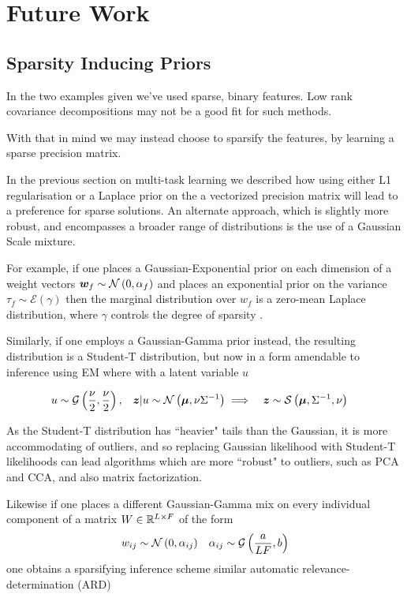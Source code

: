 

\section{Future Work}
\subsection{Sparsity Inducing Priors}
In the two examples given we've used sparse, binary features. Low rank covariance decompositions may not be a good fit for such methods.

With that in mind we may instead choose to sparsify the features, by learning a sparse precision matrix.

In the previous section on multi-task learning we described how using either L1 regularisation or a Laplace prior on the a vectorized precision matrix will lead to a preference for sparse solutions. An alternate approach, which is slightly more robust, and encompasses a broader range of distributions is the use of a Gaussian Scale mixture.

For example, if one places a Gaussian-Exponential prior on each dimension of a weight vectors $\bm w_f \sim \mathcal{N} \left( {0}, {\alpha_f} \right)$ and places an exponential prior on the variance $\tau_f \sim \mathcal{E}\left(\gamma\right)$ then the marginal distribution over $w_f$ is a zero-mean Laplace distribution, where $\gamma$ controls the degree of sparsity \cite{Figueiredo2003}.

Similarly, if one employs a Gaussian-Gamma prior instead, the resulting distribution is a Student-T distribution, but now in a form amendable to inference using EM where with a latent variable $u$

\begin{align}
u & \sim \mathcal{G}\left(\frac{\nu}{2}, \frac{\nu}{2} \right) ,
& \bm z|u \sim \mathcal{N} \left( {\bm \mu}, {\nu {\Sigma}^{-1}} \right) 
& \implies & \bm z & \sim \mathcal{S}\left(\bm \mu, {\Sigma}^{-1}, \nu \right)
\end{align}

As the Student-T distribution has ``heavier" tails than the Gaussian, it is more accommodating of outliers, and so replacing Gaussian likelihood with Student-T likelihoods can lead algorithms which are more ``robust" to outliers, such as PCA and CCA\cite{Archambeau2006a}, and also matrix factorization\cite{Balaji2011}.

Likewise if one places a different Gaussian-Gamma mix on every individual component of a matrix $W \in { \mathbb{R}^{L \times F} }$ of the form
\begin{align}
w_{ij} &\sim \mathcal{N} \left( {0}, {\alpha_{ij}} \right) & \alpha_{ij} \sim \mathcal{G}\left(\frac{a}{LF}, b\right)
\end{align}
one obtains a sparsifying inference scheme\cite{Archambeau2009a} similar automatic relevance-determination (ARD)

